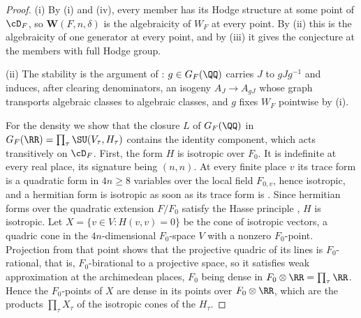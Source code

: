 \begin{proof}
(i) By (i) and (iv), every member has its Hodge structure
at some point of $\cD_{F}$, so $\mathbf{W}(F,n,\delta)$ is the algebraicity of
$W_{F}$ at every point. By (ii) this is the algebraicity of
one generator at every point, and by (iii) it gives the
conjecture at the members with full Hodge group.

(ii) The stability is the argument of : $g\in G_{F}(\QQ)$
carries $J$ to $gJg^{-1}$ and induces, after clearing denominators, an isogeny
$A_{J}\to A_{gJ}$ whose graph transports algebraic classes to algebraic
classes, and $g$ fixes $W_{F}$ pointwise by (i).

For the density we show that the closure $L$ of $G_{F}(\QQ)$ in
$G_{F}(\RR)=\prod_{\tau}\SU(V_{\tau},H_{\tau})$ contains the identity
component, which acts transitively on $\cD_{F}$. First, the form $H$ is
isotropic over $F_{0}$. It is indefinite at every real place, its signature
being $(n,n)$. At every finite place $v$ its trace form is a quadratic form
in $4n\ge8$ variables over the local field $F_{0,v}$, hence isotropic, and a
hermitian form is isotropic as soon as its trace form is
\cite[Ch.~10, \S1]{Sch85}. Since hermitian forms over the quadratic
extension $F/F_{0}$ satisfy the Hasse principle \cite[Ch.~10, \S6]{Sch85},
$H$ is isotropic. Let $X=\{v\in V:H(v,v)=0\}$ be the cone of isotropic
vectors, a quadric cone in the $4n$-dimensional $F_{0}$-space $V$ with a
nonzero $F_{0}$-point. Projection from that point shows that the projective
quadric of its lines is $F_{0}$-rational, that is, $F_{0}$-birational to a
projective space, so it satisfies weak approximation at the archimedean
places, $F_{0}$ being dense in $F_{0}\otimes\RR=\prod_{\tau}\RR$. Hence the
$F_{0}$-points of $X$ are dense in its points over $F_{0}\otimes\RR$, which
are the products $\prod_{\tau}X_{\tau}$ of the isotropic cones of the
$H_{\tau}$.


\end{proof}
